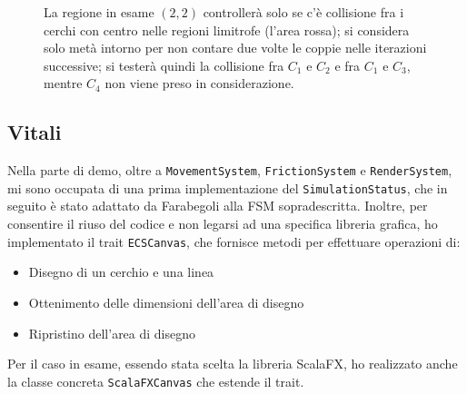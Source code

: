 \begin{figure}[H]
    \centering
    \caption{La regione in esame $(2, 2)$ controllerà solo se c'è collisione fra i cerchi con centro nelle regioni limitrofe (l'area rossa);
    si considera solo metà intorno per non contare due volte le coppie nelle iterazioni successive;
    si testerà quindi la collisione fra $C_1$ e $C_2$ e fra $C_1$ e $C_3$, mentre $C_4$ non viene preso in considerazione.}
    \label{fig:space-partition}
\end{figure}

\subsection{Vitali}\label{subsec:demo-vitali}
Nella parte di demo, oltre a \texttt{MovementSystem}, \texttt{FrictionSystem} e \texttt{RenderSystem},
mi sono occupata di una prima implementazione del \texttt{SimulationStatus}, che in seguito è stato adattato da Farabegoli
alla FSM sopradescritta.
Inoltre, per consentire il riuso del codice e non legarsi ad una specifica libreria grafica, ho
implementato il trait \texttt{ECSCanvas}, che fornisce metodi per effettuare operazioni di:
\begin{itemize}
    \item Disegno di un cerchio e una linea
    \item Ottenimento delle dimensioni dell'area di disegno
    \item Ripristino dell'area di disegno
\end{itemize}
Per il caso in esame, essendo stata scelta la libreria ScalaFX, ho realizzato anche la classe concreta \texttt{ScalaFXCanvas} che
estende il trait.
